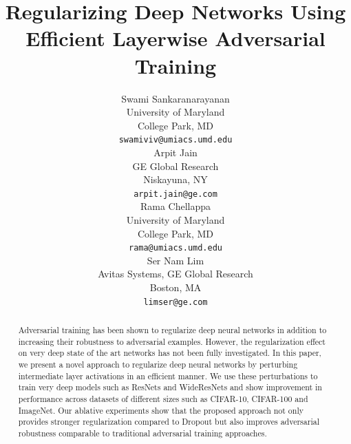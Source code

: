 \documentclass[letterpaper]{article} %
\begin{document}
 
\title{Regularizing Deep Networks Using Efficient Layerwise Adversarial Training}
\author{
  Swami Sankaranarayanan \\
  University of Maryland\\
  College Park, MD\\
  \texttt{swamiviv@umiacs.umd.edu} \\
  \And
  Arpit Jain \\
  GE Global Research\\
  Niskayuna, NY\\  
  \texttt{arpit.jain@ge.com} \\
  \AND
  Rama Chellappa \\
  University of Maryland\\
  College Park, MD\\
  \texttt{rama@umiacs.umd.edu} \\
  \And
  Ser Nam Lim \\
  Avitas Systems,
  GE Global Research\\
  Boston, MA\\  
  \texttt{limser@ge.com} \\
}
  
\maketitle
\begin{abstract}

Adversarial training has been shown to regularize deep neural networks in addition to increasing their robustness to adversarial examples. However, the regularization effect on very deep state of the art networks has not been fully investigated. In this paper, we present a novel approach to regularize deep neural networks by perturbing intermediate layer activations in an efficient manner. We use these perturbations to train very deep models such as ResNets and WideResNets and show improvement in performance across datasets of different sizes such as CIFAR-10, CIFAR-100 and ImageNet. Our ablative experiments show that the proposed approach not only provides stronger regularization compared to Dropout but also improves adversarial robustness comparable to traditional adversarial training approaches.
\end{abstract}


\end{document}
